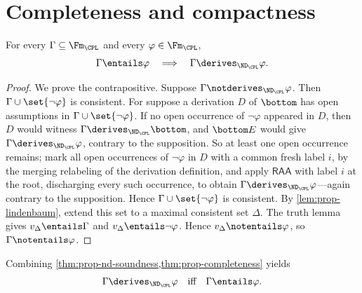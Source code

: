 \section{Completeness and compactness}
\label{sec:prop-metatheory-03}

\begin{theorem}
\label{thm:prop-completeness}
For every \(\Gamma\subseteq\Fm_{\CPL}\) and every
\(\varphi\in\Fm_{\CPL}\),
\[
  \Gamma\entails\varphi
  \quad\Longrightarrow\quad
  \Gamma\derives_{\ND_{\CPL}}\varphi.
\]
\end{theorem}
\begin{proof}
We prove the contrapositive.  Suppose
\(\Gamma\notderives_{\ND_{\CPL}}\varphi\).  Then
\(\Gamma\cup\set{\neg\varphi}\) is consistent.  For suppose a derivation
\(D\) of \(\bottom\) has open assumptions in
\(\Gamma\cup\set{\neg\varphi}\).  If no open occurrence of
\(\neg\varphi\) appeared in \(D\), then \(D\) would witness
\(\Gamma\derives_{\ND_{\CPL}}\bottom\), and \(\bottom E\) would give
\(\Gamma\derives_{\ND_{\CPL}}\varphi\), contrary to the supposition.  So
at least one open occurrence remains; mark all open occurrences of
\(\neg\varphi\) in \(D\) with a common fresh label \(i\), by the merging
relabeling of the derivation definition, and apply \(\mathsf{RAA}\) with
label \(i\) at the root, discharging every such occurrence, to obtain
\(\Gamma\derives_{\ND_{\CPL}}\varphi\)---again contrary to the
supposition.  Hence \(\Gamma\cup\set{\neg\varphi}\) is consistent.  By
\cref{lem:prop-lindenbaum}, extend this set to a maximal
consistent set \(\Delta\).  The truth lemma gives
\(v_\Delta\entails\Gamma\) and
\(v_\Delta\entails\neg\varphi\).  Hence
\(v_\Delta\notentails\varphi\), so
\(\Gamma\notentails\varphi\).
\end{proof}

Combining \cref{thm:prop-nd-soundness,thm:prop-completeness} yields
\[
  \Gamma\derives_{\ND_{\CPL}}\varphi
  \quad\text{iff}\quad
  \Gamma\entails\varphi.
\]

